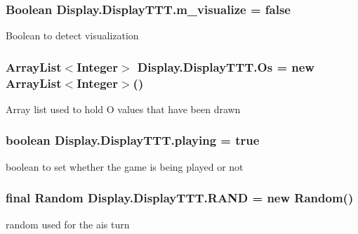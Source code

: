 \subsubsection[{m\+\_\+visualize}]{\setlength{\rightskip}{0pt plus 5cm}Boolean Display.\+Display\+T\+T\+T.\+m\+\_\+visualize = false\hspace{0.3cm}{\ttfamily [private]}}\label{class_display_1_1_display_t_t_t_a92b6a913aec2926f4fdf565a4146bb31}
Boolean to detect visualization \hypertarget{class_display_1_1_display_t_t_t_a06c277ab266ff9c323c13e1fd50299d2}{}
\subsubsection[{Os}]{\setlength{\rightskip}{0pt plus 5cm}Array\+List$<$Integer$>$ Display.\+Display\+T\+T\+T.\+Os = new Array\+List$<$Integer$>$()\hspace{0.3cm}{\ttfamily [private]}}\label{class_display_1_1_display_t_t_t_a06c277ab266ff9c323c13e1fd50299d2}
Array list used to hold O values that have been drawn \hypertarget{class_display_1_1_display_t_t_t_abea0091c8be45438d7be31081d6b8bc3}{}
\subsubsection[{playing}]{\setlength{\rightskip}{0pt plus 5cm}boolean Display.\+Display\+T\+T\+T.\+playing = true\hspace{0.3cm}{\ttfamily [private]}}\label{class_display_1_1_display_t_t_t_abea0091c8be45438d7be31081d6b8bc3}
boolean to set whether the game is being played or not \hypertarget{class_display_1_1_display_t_t_t_a532c82249100ab477c093e5202b42415}{}
\subsubsection[{R\+A\+N\+D}]{\setlength{\rightskip}{0pt plus 5cm}final Random Display.\+Display\+T\+T\+T.\+R\+A\+N\+D = new Random()\hspace{0.3cm}{\ttfamily [private]}}\label{class_display_1_1_display_t_t_t_a532c82249100ab477c093e5202b42415}
random used for the ai\textquotesingle{}s turn \hypertarget{class_display_1_1_display_t_t_t_a30415017d1d80126ca6295a1d711684d}{}
